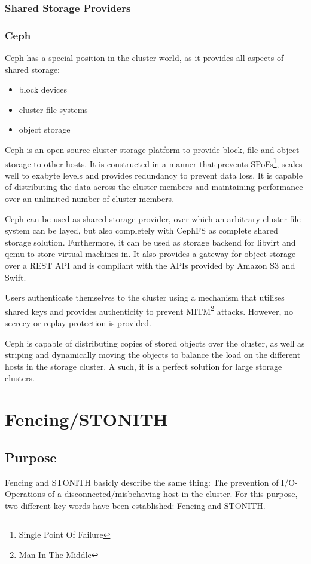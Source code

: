 \subsubsection{Shared Storage Providers}
\subsubsection{Ceph}
Ceph has a special position in the cluster world, as it provides all aspects of shared storage:
\begin{itemize}
\item block devices
\item cluster file systems
\item object storage
\end{itemize}

Ceph is an open source cluster storage platform to provide block, file and object storage to other hosts. It is constructed in a manner that prevents SPoFs\footnote{Single Point Of Failure}, scales well to exabyte levels and provides redundancy to prevent data loss. It is capable of distributing the data across the cluster members and maintaining performance over an unlimited number of cluster members.

Ceph can be used as shared storage provider, over which an arbitrary cluster file system can be layed, but also completely with CephFS as complete shared storage solution. Furthermore, it can be used as storage backend for libvirt and qemu to store virtual machines in. It also provides a gateway for object storage over a REST API and is compliant with the APIs provided by Amazon S3 and Swift.%

Users authenticate themselves to the cluster using a mechanism that utilises shared keys and provides authenticity to prevent MITM\footnote{Man In The Middle} attacks. However, no secrecy or replay protection is provided\cite{ceph_architecture}.

Ceph is capable of distributing copies of stored objects over the cluster, as well as striping and dynamically moving the objects to balance the load on the different hosts in the storage cluster. A such, it is a perfect solution for large storage clusters.

\section{Fencing/STONITH}
\subsection{Purpose}
Fencing and STONITH basicly describe the same thing: The prevention of I/O-Operations of a disconnected/misbehaving host in the cluster.
For this purpose, two different key words have been established: Fencing and \ac{STONITH}.
